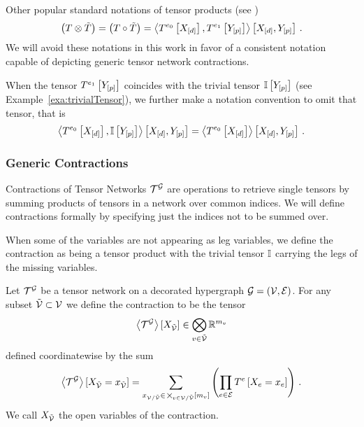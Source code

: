 Other popular standard notations of tensor products (see \cite{kolda_tensor_2009,hackbusch_tensor_2012,cichocki_tensor_2015}) 
	\[ \left(T \otimes \tilde{T}\right) = \left(T \circ \tilde{T}\right)  
	= \left\langle T^{e_0}\left[X_{[d]}\right],T^{e_1}\left[Y_{[p]}\right]\right\rangle \left[ X_{[d]},Y_{[p]} \right]  \, . \]
We will avoid these notations in this work in favor of a consistent notation capable of depicting generic tensor network contractions.

When the tensor $T^{e_1}\left[Y_{[p]}\right]$ coincides with the trivial tensor $\mathbb{I}\left[Y_{[p]}\right]$ (see Example~\ref{exa:trivialTensor}), we further make a notation convention to omit that tensor, that is
\begin{align*}
	\left\langle T^{e_0}\left[X_{[d]}\right],\mathbb{I}\left[Y_{[p]}\right]\right\rangle \left[ X_{[d]},Y_{[p]} \right]  
	= \left\langle T^{e_0}\left[X_{[d]}\right]\right\rangle \left[ X_{[d]},Y_{[p]} \right] \, .
\end{align*}


\subsubsection{Generic Contractions}


Contractions of Tensor Networks $\mathcal{T}^{\mathcal{G}}$ are operations to retrieve single tensors by summing products of tensors in a network over common indices.
We will define contractions formally by specifying just the indices not to be summed over.

When some of the variables are not appearing as leg variables, we define the contraction as being a tensor product with the trivial tensor $\mathbb{I}$ carrying the legs of the missing variables.

\begin{definition}\label{def:contraction}
	Let $\mathcal{T}^{\mathcal{G}}$ be a tensor network on a decorated hypergraph $\mathcal{G}=(\mathcal{V},\mathcal{E})$.
	For any subset $\tilde{\mathcal{V}}\subset\mathcal{V}$ we define the contraction  to be the tensor 
	\begin{align}
		\left\langle \mathcal{T}^{\mathcal{G}}\right\rangle \left[ X_{\tilde{\mathcal{V}}} \right] \in \bigotimes_{v\in\tilde{\mathcal{V}}} \mathbb{R}^{m_{v}}
	\end{align}
	defined coordinatewise by the sum	
	\begin{align}
		\left\langle \mathcal{T}^{\mathcal{G}}\right\rangle \left[ X_{\tilde{\mathcal{V}}}=x_{\tilde{\mathcal{V}}} \right] =
		\sum_{x_{\mathcal{V}/\tilde{\mathcal{V}}} \in\,\bigtimes_{v\in\mathcal{V}/\tilde{\mathcal{V}}}[m_{v}]}
		\left( \prod_{e\in\mathcal{E}}T^{e}\left[X_{e}=x_{e}\right] \right) \, .
	\end{align}
	We call $X_{\tilde{\mathcal{V}}}$ the open variables of the contraction.
\end{definition}


